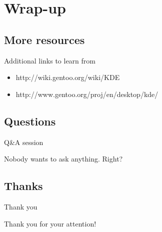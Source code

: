 \documentclass{beamer}
\begin{document}
\section{Wrap-up}

\subsection{More resources}
\begin{frame}{Additional links to learn from}
	\begin{itemize}
		\item http://wiki.gentoo.org/wiki/KDE
		\item http://www.gentoo.org/proj/en/desktop/kde/
	\end{itemize}
\end{frame}

\subsection{Questions}
\begin{frame}{Q\&A session}
	\begin{center}Nobody wants to ask anything. Right?\end{center}
\end{frame}

\subsection{Thanks}
\begin{frame}{Thank you}
	\begin{center}Thank you for your attention!\end{center}
\end{frame}
\end{document}
